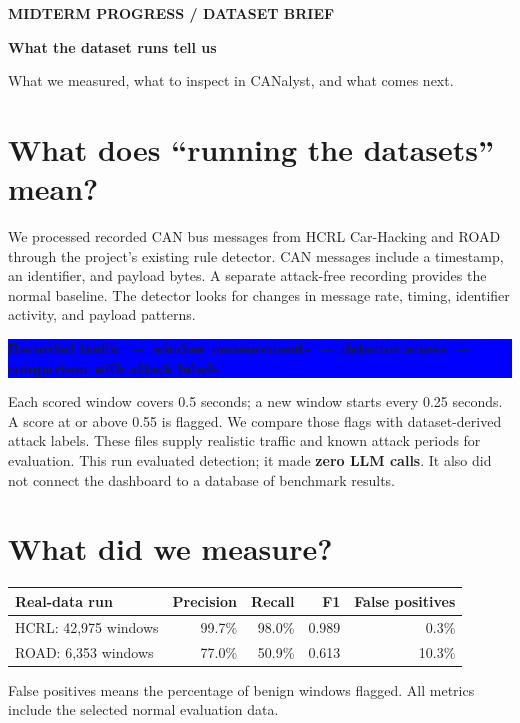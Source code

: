 \documentclass[10pt,letterpaper]{article}
\newcommand{\callout}[2]{\begingroup\setlength{\fboxsep}{10pt}\noindent\colorbox{#1}{\parbox{\dimexpr\linewidth-20pt\relax}{#2}}\endgroup}
\begin{document}
{\small\bfseries\color{sage}MIDTERM PROGRESS \quad / \quad DATASET BRIEF}\par
{\fontsize{23}{27}\selectfont\bfseries What the dataset runs tell us}\par
{\color{muted}What we measured, what to inspect in CANalyst, and what comes next.}

\section{What does ``running the datasets'' mean?}
We processed recorded CAN bus messages from HCRL Car-Hacking and ROAD through the project's existing rule detector. CAN messages include a timestamp, an identifier, and payload bytes. A separate attack-free recording provides the normal baseline. The detector looks for changes in message rate, timing, identifier activity, and payload patterns.

\callout{blue}{\textbf{Recorded traffic} $\rightarrow$ \textbf{window measurements} $\rightarrow$ \textbf{detector scores} $\rightarrow$ \textbf{comparison with attack labels}}

Each scored window covers 0.5 seconds; a new window starts every 0.25 seconds. A score at or above 0.55 is flagged. We compare those flags with dataset-derived attack labels. These files supply realistic traffic and known attack periods for evaluation. This run evaluated detection; it made \textbf{zero LLM calls}. It also did not connect the dashboard to a database of benchmark results.

\section{What did we measure?}
\renewcommand{\arraystretch}{1.35}
\begin{tabularx}{\linewidth}{@{}>{\raggedright\arraybackslash}X r r r r@{}}
\toprule
\textbf{Real-data run} & \textbf{Precision} & \textbf{Recall} & \textbf{F1} & \textbf{False positives} \\
\midrule
HCRL: 42,975 windows & 99.7\% & 98.0\% & 0.989 & 0.3\% \\
ROAD: 6,353 windows & 77.0\% & 50.9\% & 0.613 & 10.3\% \\
\bottomrule
\end{tabularx}
\par\vspace{3pt}
{\footnotesize\color{muted}False positives means the percentage of benign windows flagged. All metrics include the selected normal evaluation data.}
\end{document}
